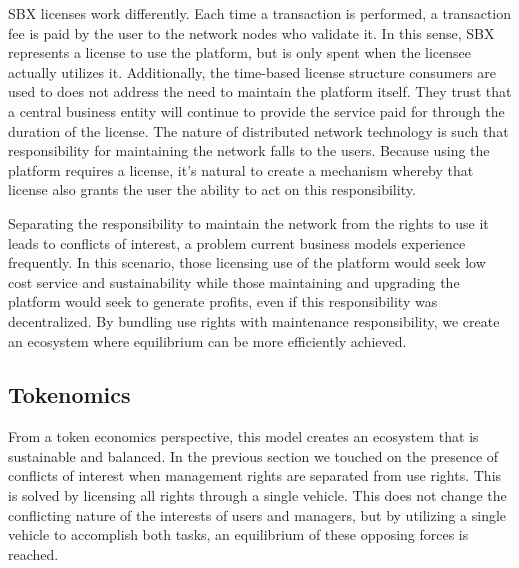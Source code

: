 \documentclass[12pt]{article}
\begin{document}
SBX licenses work differently. Each time a transaction is performed, a transaction fee is paid by the user to the network nodes who validate it. In this sense, SBX represents a license to use the platform, but is only spent when the licensee actually utilizes it. Additionally, the time-based license structure consumers are used to does not address the need to maintain the platform itself. They trust that a central business entity will continue to provide the service paid for through the duration of the license. The nature of distributed network technology is such that responsibility for maintaining the network falls to the users. Because using the platform requires a license, it’s natural to create a mechanism whereby that license also grants the user the ability to act on this responsibility.

Separating the responsibility to maintain the network from the rights to use it leads to conflicts of interest, a problem current business models experience frequently. In this scenario, those licensing use of the platform would seek low cost service and sustainability while those maintaining and upgrading the platform would seek to generate profits, even if this responsibility was decentralized. By bundling use rights with maintenance responsibility, we create an ecosystem where equilibrium can be more efficiently achieved.

\subsection{Tokenomics}
From a token economics perspective, this model creates an ecosystem that is sustainable and balanced. In the previous section we touched on the presence of conflicts of interest when management rights are separated from use rights. This is solved by licensing all rights through a single vehicle. This does not change the conflicting nature of the interests of users and managers, but by utilizing a single vehicle to accomplish both tasks, an equilibrium of these opposing forces is reached.
\end{document}

